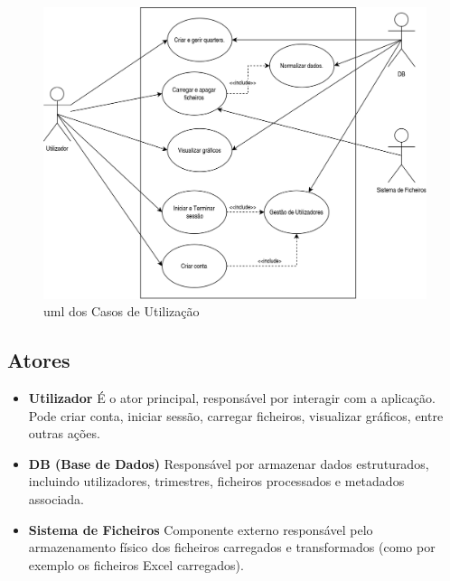 \begin{figure}[h]
\centering
\includegraphics[max width=\textwidth]{./img/usecase_uml}
\caption{\gls{uml} dos Casos de Utilização}
\label{fig:umlCasosUtilizacao}
\end{figure}

\subsection{Atores}
\begin{itemize}
    \item \textbf{Utilizador} É o ator principal, responsável por interagir com a aplicação. Pode criar conta, iniciar sessão, carregar ficheiros, visualizar gráficos, entre outras ações.
    \item \textbf{DB (Base de Dados)} Responsável por armazenar dados estruturados, incluindo utilizadores, trimestres, ficheiros processados e metadados associada.
    \item \textbf{Sistema de Ficheiros} Componente externo responsável pelo armazenamento físico dos ficheiros carregados e transformados (como por exemplo os ficheiros Excel carregados).
\end{itemize}

